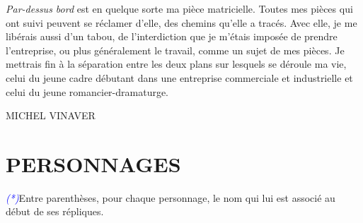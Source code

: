 \documentclass[a4paper]{report}
\newcommand{\annot}[1]{{\footnotesize \textcolor{blue}{\textit{(#1)}}}}
\begin{document}
\textit{Par-dessus bord} est en quelque sorte ma pièce matricielle. Toutes mes pièces qui ont suivi peuvent se réclamer d'elle, des chemins qu'elle a tracés. Avec elle, je me libérais aussi d'un tabou, de l'interdiction que je m'étais imposée de prendre l'entreprise, ou plus généralement le travail, comme un sujet de mes pièces. Je mettrais fin à la séparation entre les deux plans sur lesquels se déroule ma vie, celui du jeune cadre débutant dans une entreprise commerciale et industrielle et celui du jeune romancier-dramaturge.

\begin{flushright}
MICHEL VINAVER
\end{flushright}

\chapter*{PERSONNAGES}

\annot*{Entre parenthèses, pour chaque personnage, le nom qui lui est associé au début de ses répliques.}
\end{document}

